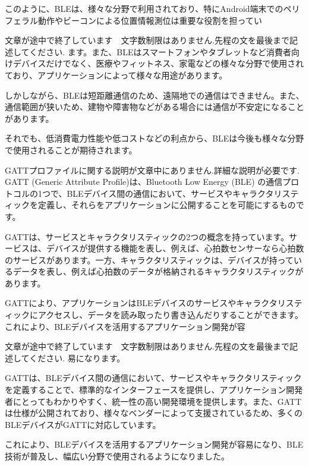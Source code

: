 このように、BLEは、様々な分野で利用されており、特にAndroid端末でのペリフェラル動作やビーコンによる位置情報測位は重要な役割を担ってい





文章が途中で終了しています　文字数制限はありません.先程の文を最後まで記述してください.
ます。また、BLEはスマートフォンやタブレットなど消費者向けデバイスだけでなく、医療やフィットネス、家電などの様々な分野で使用されており、アプリケーションによって様々な用途があります。

しかしながら、BLEは短距離通信のため、遠隔地での通信はできません。また、通信範囲が狭いため、建物や障害物などがある場合には通信が不安定になることがあります。

それでも、低消費電力性能や低コストなどの利点から、BLEは今後も様々な分野で使用されることが期待されます。





GATTプロファイルに関する説明が文章中にありません.詳細な説明が必要です.
GATT (Generic Attribute Profile)は、Bluetooth Low Energy (BLE) の通信プロトコルの1つで、BLEデバイス間の通信において、サービスやキャラクタリスティックを定義し、それらをアプリケーションに公開することを可能にするものです。

GATTは、サービスとキャラクタリスティックの2つの概念を持っています。サービスは、デバイスが提供する機能を表し、例えば、心拍数センサーなら心拍数のサービスがあります。一方、キャラクタリスティックは、デバイスが持っているデータを表し、例えば心拍数のデータが格納されるキャラクタリスティックがあります。

GATTにより、アプリケーションはBLEデバイスのサービスやキャラクタリスティックにアクセスし、データを読み取ったり書き込んだりすることができます。これにより、BLEデバイスを活用するアプリケーション開発が容





文章が途中で終了しています　文字数制限はありません.先程の文を最後まで記述してください.
易になります。

GATTは、BLEデバイス間の通信において、サービスやキャラクタリスティックを定義することで、標準的なインターフェースを提供し、アプリケーション開発者にとってもわかりやすく、統一性の高い開発環境を提供します。また、GATTは仕様が公開されており、様々なベンダーによって支援されているため、多くのBLEデバイスがGATTに対応しています。

これにより、BLEデバイスを活用するアプリケーション開発が容易になり、BLE技術が普及し、幅広い分野で使用されるようになりました。





